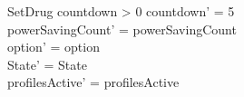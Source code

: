 \begin{schema}{SetDrug}
	countdown > 0 \land countdown' = 5\\
	\pagebreak
	powerSavingCount' = powerSavingCount\\ 
	option' = option\\
State' = State\\
profilesActive' = profilesActive
\end{schema}

